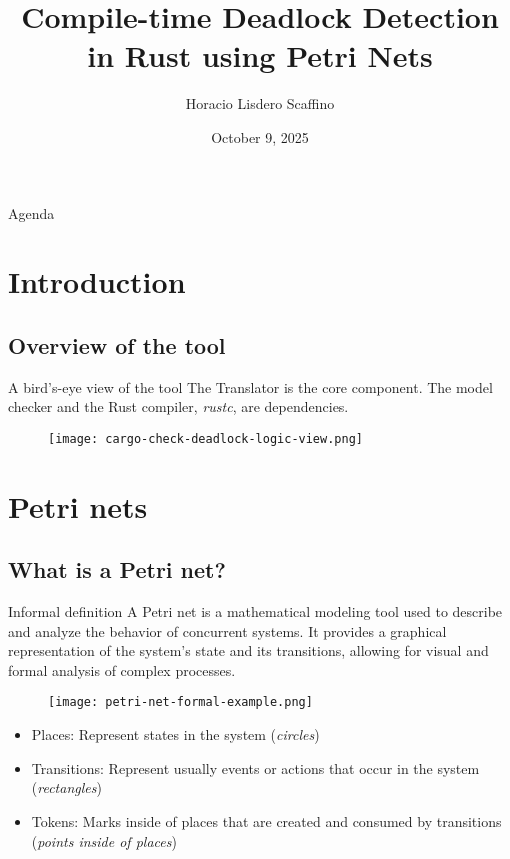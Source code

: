 \documentclass{beamer}
\title[Compile-time Deadlock Detection in Rust]{Compile-time Deadlock Detection \\ in Rust using Petri Nets}
\author{Horacio Lisdero Scaffino}
\date{October 9, 2025}
\begin{document}
\begin{frame}
  \titlepage
\end{frame}

\logo{}

\begin{frame}{Agenda}
  \tableofcontents
\end{frame}

\section{Introduction}

\subsection{Overview of the tool}

\begin{frame}{A bird's-eye view of the tool}
  The Translator is the core component.
  The model checker and the Rust compiler, \emph{rustc}, are dependencies.

  \begin{figure}
    \centering
    \texttt{[image: cargo-check-deadlock-logic-view.png]}
  \end{figure}
\end{frame}

\section{Petri nets}

\subsection{What is a Petri net?}

\begin{frame}{Informal definition}
  A Petri net is a mathematical modeling tool
  used to describe and analyze the behavior of concurrent systems.
  It provides a graphical representation of the system's state and its transitions,
  allowing for visual and formal analysis of complex processes.

  \begin{figure}[!htb]
    \centering
    \texttt{[image: petri-net-formal-example.png]}
  \end{figure}

  \scriptsize
  \begin{itemize}
    \item Places: Represent states in the system (\emph{circles})
    \item Transitions: Represent usually events or actions that occur in the system (\emph{rectangles})
    \item Tokens: Marks inside of places that are created
          and consumed by transitions (\emph{points inside of places})
  \end{itemize}

  \vfill
\end{frame}
\end{document}
